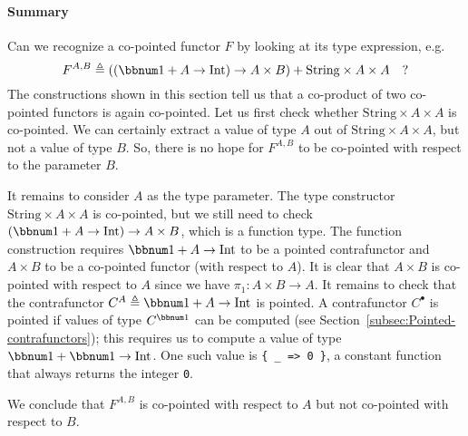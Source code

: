 \paragraph{Summary}

Can we recognize a co-pointed functor $F$ by looking at its type
expression, e.g.
\[
F^{A,B}\triangleq\left(\left(\bbnum 1+A\rightarrow\text{Int}\right)\rightarrow A\times B\right)+\text{String}\times A\times A\quad?
\]
The constructions shown in this section tell us that a co-product
of two co-pointed functors is again co-pointed. Let us first check
whether $\text{String}\times A\times A$ is co-pointed. We can certainly
extract a value of type $A$ out of $\text{String}\times A\times A$,
but not a value of type $B$. So, there is no hope for $F^{A,B}$
to be co-pointed with respect to the parameter $B$.

It remains to consider $A$ as the type parameter. The type constructor
$\text{String}\times A\times A$ is co-pointed, but we still need
to check $\left(\bbnum 1+A\rightarrow\text{Int}\right)\rightarrow A\times B$,
which is a function type. The function construction requires $\bbnum 1+A\rightarrow\text{Int}$
to be a pointed contrafunctor and $A\times B$ to be a co-pointed
functor (with respect to $A$). It is clear that $A\times B$ is co-pointed
with respect to $A$ since we have $\pi_{1}:A\times B\rightarrow A$.
It remains to check that the contrafunctor $C^{A}\triangleq\bbnum 1+A\rightarrow\text{Int}$
is pointed. A contrafunctor $C^{\bullet}$ is pointed if values of
type $C^{\bbnum 1}$ can be computed (see Section~\ref{subsec:Pointed-contrafunctors});
this requires us to compute a value of type $\bbnum 1+\bbnum 1\rightarrow\text{Int}$.
One such value is \lstinline!{ _ => 0 }!, a constant function that
always returns the integer \lstinline!0!. 

We conclude that $F^{A,B}$ is co-pointed with respect to $A$ but
not co-pointed with respect to $B$.

